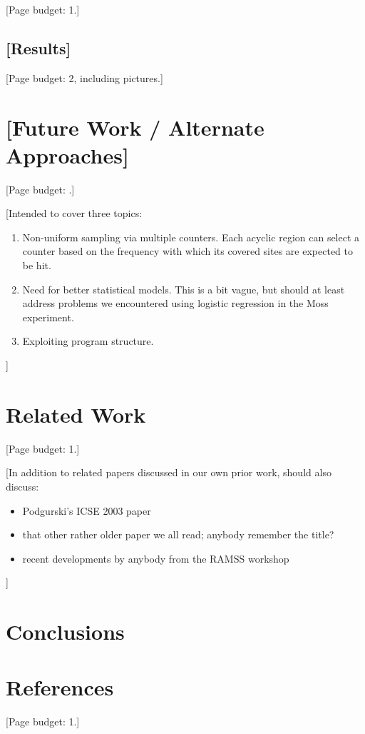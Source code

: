 \documentclass{acm_proc_article-sp}
\newcommand{\placeholder}[1]{{\color[cmyk]{0,0.61,0.87,0}[#1]}}
\begin{document}
\placeholder{Page budget: 1.}



\subsection{\placeholder{Results}}

\placeholder{Page budget: 2, including pictures.}


\section{\placeholder{Future Work / Alternate Approaches}}

\placeholder{Page budget: .}

\placeholder{Intended to cover three topics:

  \begin{enumerate}
  \item Non-uniform sampling via multiple counters.  Each acyclic
    region can select a counter based on the frequency with which its
    covered sites are expected to be hit.

  \item Need for better statistical models.  This is a bit vague, but
    should at least address problems we encountered using logistic
    regression in the Moss experiment.

  \item Exploiting program structure.
  \end{enumerate}}


\section{Related Work}

\placeholder{Page budget: 1.}

\placeholder{In addition to related papers discussed in our own prior
  work, should also discuss:

  \begin{itemize}
  \item Podgurski's ICSE 2003 paper
  \item that other rather older paper we all read; anybody remember
    the title?
  \item recent developments by anybody from the RAMSS workshop
  \end{itemize}}


\section{Conclusions}


\section{References}

\placeholder{Page budget: 1.}
\end{document}
